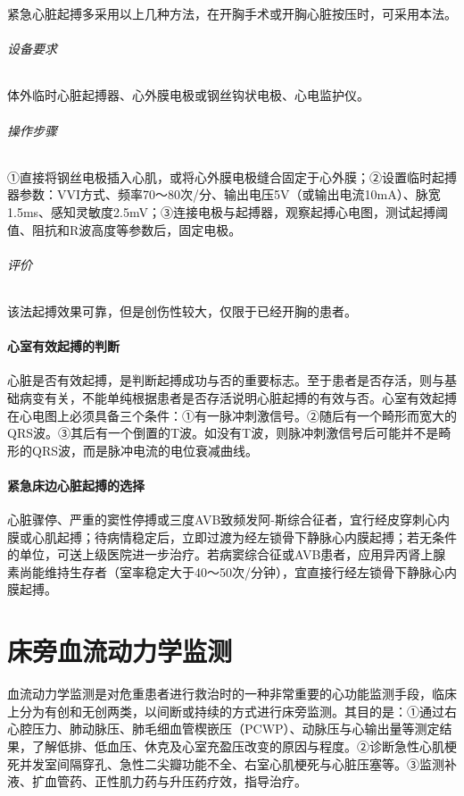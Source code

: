 紧急心脏起搏多采用以上几种方法，在开胸手术或开胸心脏按压时，可采用本法。

\subparagraph{设备要求}

体外临时心脏起搏器、心外膜电极或钢丝钩状电极、心电监护仪。

\subparagraph{操作步骤}

①直接将钢丝电极插入心肌，或将心外膜电极缝合固定于心外膜；②设置临时起搏器参数：VVI方式、频率70～80次/分、输出电压5V（或输出电流10mA）、脉宽1.5ms、感知灵敏度2.5mV；③连接电极与起搏器，观察起搏心电图，测试起搏阈值、阻抗和R波高度等参数后，固定电极。

\subparagraph{评价}

该法起搏效果可靠，但是创伤性较大，仅限于已经开胸的患者。

\subsubsection{心室有效起搏的判断}

心脏是否有效起搏，是判断起搏成功与否的重要标志。至于患者是否存活，则与基础病变有关，不能单纯根据患者是否存活说明心脏起搏的有效与否。心室有效起搏在心电图上必须具备三个条件：①有一脉冲刺激信号。②随后有一个畸形而宽大的QRS波。③其后有一个倒置的T波。如没有T波，则脉冲刺激信号后可能并不是畸形的QRS波，而是脉冲电流的电位衰减曲线。

\subsubsection{紧急床边心脏起搏的选择}

心脏骤停、严重的窦性停搏或三度AVB致频发阿-斯综合征者，宜行经皮穿刺心内膜或心肌起搏；待病情稳定后，立即过渡为经左锁骨下静脉心内膜起搏；若无条件的单位，可送上级医院进一步治疗。若病窦综合征或AVB患者，应用异丙肾上腺素尚能维持生存者（室率稳定大于40～50次/分钟），宜直接行经左锁骨下静脉心内膜起搏。

\protect\hypertarget{text00376.html}{}{}

\chapter{床旁血流动力学监测}

血流动力学监测是对危重患者进行救治时的一种非常重要的心功能监测手段，临床上分为有创和无创两类，以间断或持续的方式进行床旁监测。其目的是：①通过右心腔压力、肺动脉压、肺毛细血管楔嵌压（PCWP）、动脉压与心输出量等测定结果，了解低排、低血压、休克及心室充盈压改变的原因与程度。②诊断急性心肌梗死并发室间隔穿孔、急性二尖瓣功能不全、右室心肌梗死与心脏压塞等。③监测补液、扩血管药、正性肌力药与升压药疗效，指导治疗。


